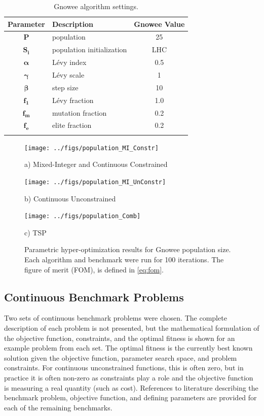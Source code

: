 \documentclass{article}                                                                           %
\begin{document}
\begin{table}[!t]
\centering
\caption{Gnowee algorithm settings.} 
\label{table:Gnowee_Setting}
\begin{tabular}{c l c }
\toprule
\textbf{Parameter}  & \textbf{Description} & \textbf{Gnowee Value} \\
\midrule
$\boldsymbol{P}$ & population & 25 \\ \addlinespace
$\boldsymbol{S_i}$ & population initialization & LHC \\ \addlinespace
$\boldsymbol{\alpha}$ & Lévy index & 0.5 \\ \addlinespace
$\boldsymbol{\gamma}$ & Lévy scale & 1 \\ \addlinespace
$\boldsymbol{\beta}$ & step size & 10 \\ \addlinespace
$\boldsymbol{f_1}$ & Lévy fraction & 1.0 \\ \addlinespace
$\boldsymbol{f_m}$ & mutation fraction & 0.2\\ \addlinespace
$\boldsymbol{f_e}$ & elite fraction & 0.2 \\ \addlinespace
\bottomrule
\end{tabular}
\end{table}

\begin{figure}[!t]
\centering
{\texttt{[image: ../figs/population\_MI\_Constr]}%
\label{p_MI_Constr}
\caption*{a) Mixed-Integer and Continuous Constrained}}
{\texttt{[image: ../figs/population\_MI\_UnConstr]}%
\label{p_MI_UnConstr}
\caption*{b) Continuous Unconstrained}}
{\texttt{[image: ../figs/population\_Comb]}%
\label{p_Comb}
\caption*{c) TSP}}
\caption{Parametric hyper-optimization results for Gnowee population size. Each algorithm and benchmark were run for 100 iterations.  The figure of merit (FOM), is defined in \autoref{eq:fom}.}
\label{fig:p_hyper}
\end{figure}

\subsection{Continuous Benchmark Problems} \label{sec:cont_bench}
Two sets of continuous benchmark problems were chosen. 
The complete description of each problem is not presented, but the mathematical formulation of the objective function, constraints, and the optimal fitness is shown for an example problem from each set.  
The optimal fitness is the currently best known solution given the objective function, parameter search space, and problem constraints.
For continuous unconstrained functions, this is often zero, but in practice it is often non-zero as constraints play a role and the objective function is measuring a real quantity (such as cost). 
References to literature describing the benchmark problem, objective function, and defining parameters are provided for each of the remaining benchmarks.   
  
\end{document}
